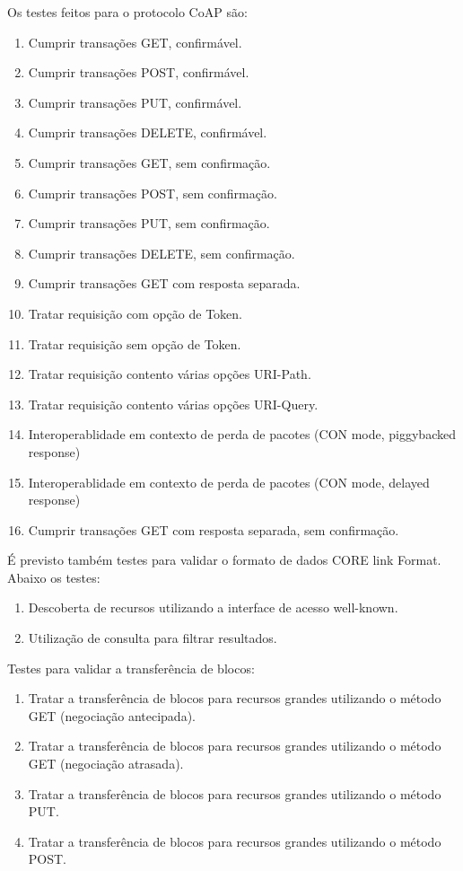Os testes feitos para o protocolo CoAP s\~ao:
\begin{enumerate}
    \item Cumprir transa\c{c}\~oes GET, confirm\'avel.
    \item Cumprir transa\c{c}\~oes POST, confirm\'avel.
    \item Cumprir transa\c{c}\~oes PUT, confirm\'avel.
    \item Cumprir transa\c{c}\~oes DELETE, confirm\'avel.
    \item Cumprir transa\c{c}\~oes GET, sem confirma\c{c}\~ao.
    \item Cumprir transa\c{c}\~oes POST, sem confirma\c{c}\~ao.
    \item Cumprir transa\c{c}\~oes PUT, sem confirma\c{c}\~ao.
    \item Cumprir transa\c{c}\~oes DELETE, sem confirma\c{c}\~ao. 
    \item Cumprir transa\c{c}\~oes GET com resposta separada.
    \item Tratar requisi\c{c}\~ao com op\c{c}\~ao de Token.
    \item Tratar requisi\c{c}\~ao sem op\c{c}\~ao de Token.
    \item Tratar requisi\c{c}\~ao contento v\'arias op\c{c}\~oes URI-Path.
    \item Tratar requisi\c{c}\~ao contento v\'arias op\c{c}\~oes URI-Query.
    \item Interoperablidade em contexto de perda de pacotes (CON mode, piggybacked response)
    \item Interoperablidade em contexto de perda de pacotes (CON mode, delayed response)
    \item Cumprir transa\c{c}\~oes GET com resposta separada, sem confirma\c{c}\~ao.
\end{enumerate}

\'E previsto tamb\'em testes para validar o formato de dados CORE link Format. Abaixo os testes:

\begin{enumerate}
    \item Descoberta de recursos utilizando a interface de acesso well-known.
    \item Utiliza\c{c}\~ao de consulta para filtrar resultados.
\end{enumerate}

Testes para validar a transfer\^encia de blocos:
\begin{enumerate}
    \item Tratar a transfer\^encia de blocos para recursos grandes utilizando o m\'etodo GET (negocia\c{c}\~ao antecipada).
    \item Tratar a transfer\^encia de blocos para recursos grandes utilizando o m\'etodo GET (negocia\c{c}\~ao atrasada).
    \item Tratar a transfer\^encia de blocos para recursos grandes utilizando o m\'etodo PUT.
    \item Tratar a transfer\^encia de blocos para recursos grandes utilizando o m\'etodo POST.
\end{enumerate}

